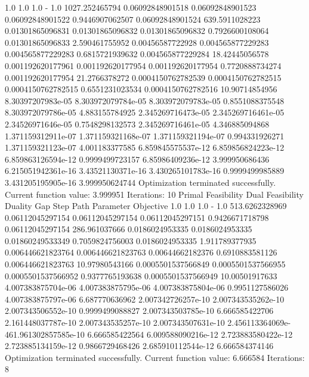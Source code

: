 \documentclass[letterpaper,10pt,english]{sphinxmanual}
\begin{document}
{\begin{sphinxVerbatim}[commandchars=\\\{\}]
1.0                 1.0                 1.0                 -                1.0                 1027.252465794
0.06092848901518    0.06092848901523    0.06092848901522    0.9446907062507  0.06092848901524    639.5911028223
0.01301865096831    0.01301865096832    0.01301865096832    0.7926600108064  0.01301865096833    2.590461755952
0.00456587722928    0.004565877229283   0.004565877229283   0.6815721939632  0.004565877229284   18.42445056578
0.001192620177961   0.001192620177954   0.001192620177954   0.7720888734274  0.001192620177954   21.2766378272
0.0004150762782539  0.0004150762782515  0.0004150762782515  0.6551231023534  0.0004150762782516  10.90714854956
8.30397207983e-05   8.303972079784e-05  8.303972079783e-05  0.8551088375548  8.303972079786e-05  4.883155784925
2.345269716473e-05  2.345269716461e-05  2.34526971646e-05   0.7548298132573  2.345269716461e-05  4.346885094868
1.371159312911e-07  1.371159321168e-07  1.371159321194e-07  0.994331926271   1.371159321123e-07  4.001183377585
6.859845575537e-12  6.859856824223e-12  6.859863126594e-12  0.9999499723157  6.85986409236e-12   3.999950686436
6.215051942361e-16  3.43521130371e-16   3.430265101783e-16  0.9999499985889  3.431205195905e-16  3.999950624744
Optimization terminated successfully.
         Current function value: 3.999951
         Iterations: 10
Primal Feasibility  Dual Feasibility    Duality Gap         Step             Path Parameter      Objective
1.0                 1.0                 1.0                 -                1.0                 513.6262328969
0.06112045297154    0.06112045297154    0.06112045297151    0.9426671718798  0.06112045297154    286.961037666
0.0186024953335     0.0186024953335     0.01860249533349    0.7059824756003  0.0186024953335     1.911789377935
0.006446621823764   0.006446621823763   0.00644662182376    0.6910883581126  0.006446621823763   10.97980543166
0.0005501537566849  0.0005501537566955  0.0005501537566952  0.9377765193638  0.0005501537566949  10.00501917633
4.007383875704e-06  4.007383875795e-06  4.007383875804e-06  0.9951127586026  4.007383875797e-06  6.687770636962
2.007342726257e-10  2.007343535262e-10  2.007343506552e-10  0.9999499088827  2.007343503785e-10  6.666585422706
2.161448037787e-10  2.007343535257e-10  2.007343507631e-10  2.456113364069e-461.961302857585e-10  6.666585422564
6.009588090216e-12  2.723883580422e-12  2.723885134159e-12  0.9866729468426  2.685910112544e-12  6.666584374146
Optimization terminated successfully.
         Current function value: 6.666584
         Iterations: 8
\end{sphinxVerbatim}
}
\end{document}

